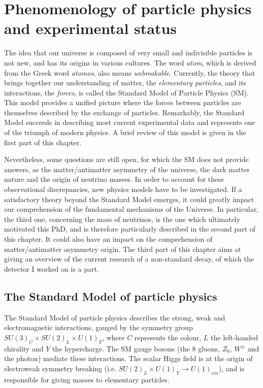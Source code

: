 \chapter{Phenomenology of particle physics and experimental status}
\label{ch:pheno}

The idea that our universe is composed of very small and indivisible particles is not new, and has its origins in various cultures.
The word \emph{atom}, which is derived from the Greek word \emph{atomos}, also means \emph{unbreakable}.
Currently, the theory that brings together our understanding of matter, the \emph{elementary particles}, and its interactions, the \emph{forces}, is called the Standard Model of Particle Physics (SM).
This model provides a unified picture where the forces between particles are themselves described by the exchange of particles.
Remarkably, the Standard Model succeeds in describing most current experimental data and represents one of the triumph of modern physics.
A brief review of this model is given in the first part of this chapter.

Nevertheless, some questions are still open, for which the SM does not provide answers, as the matter/antimatter asymmetry of the universe, the dark matter nature and the origin of neutrino masses.
In order to account for these observational discrepancies, new physics models have to be investigated.
If a satisfactory theory beyond the Standard Model emerges, it could greatly impact our comprehension of the fundamental mechanisms of the Universe.
In particular, the third one, concerning the mass of neutrinos, is the one which ultimately motivated this PhD, and is therefore particularly described in the second part of this chapter.
It could also have an impact on the comprehension of matter/antimatter asymmetry origin.
The third part of this chapter aims at giving an overview of the current research of a non-standard decay, of which the detector I worked on is a part.



\section{The Standard Model of particle physics}


The Standard Model of particle physics describes the strong, weak and electromagnetic interactions, gauged by the symmetry group $SU(3)_{C}\times SU(2)_{L}\times U(1)_{Y}$, where $C$ represents the colour, $L$ the left-handed chirality and $Y$ the hypercharge.
The SM gauge bosons (the $8$ gluons, $Z_{0}$, $W^{\pm}$ and the photon) mediate these interactions.
The scalar Higgs field is at the origin of electroweak symmetry breaking (i.e. $SU(2)_{L}\times U(1)_{Y} \rightarrow U(1)_{em}$), and is responsible for giving masses to elementary particles.

